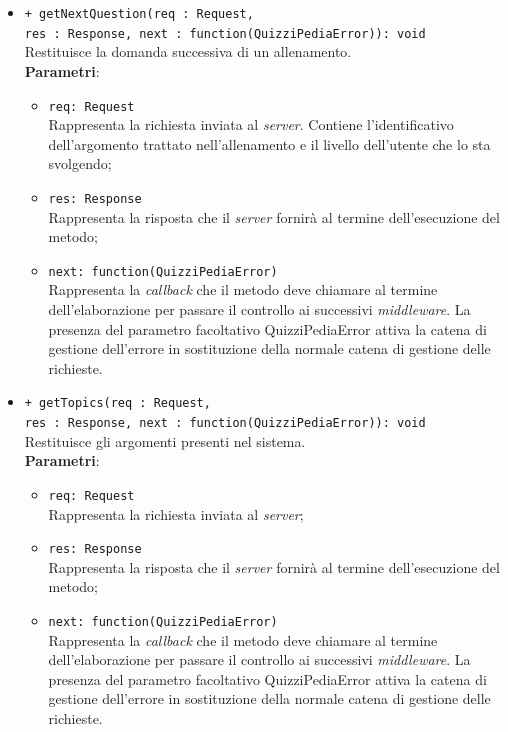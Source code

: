\begin{itemize}
\begin{itemize}
\begin{itemize}
			\end{itemize}
			\item \texttt{+ getNextQuestion(req : Request, \\res : Response, next : function(QuizziPediaError)): void} \\
			Restituisce la domanda successiva di un allenamento.  \\
			\textbf{Parametri}:
			\begin{itemize}
			\item \texttt{req: Request} \\
			Rappresenta la richiesta inviata al \textit{server}. Contiene l'identificativo dell'argomento trattato nell'allenamento e il livello dell'utente che lo sta svolgendo;
			\item \texttt{res: Response} \\
			Rappresenta la risposta che il \textit{server} fornirà al termine dell'esecuzione del metodo;
			\item \texttt{next: function(QuizziPediaError)} \\
			Rappresenta la \textit{callback} che il metodo deve chiamare al termine dell'elaborazione per passare il controllo ai successivi \textit{middleware}. La presenza del parametro facoltativo QuizziPediaError attiva la catena di gestione dell'errore in sostituzione della normale catena di gestione delle richieste.
			\end{itemize}
			\item \texttt{+ getTopics(req : Request, \\res : Response, next : function(QuizziPediaError)): void} \\
			Restituisce gli argomenti presenti nel sistema.  \\
			\textbf{Parametri}:
			\begin{itemize}
			\item \texttt{req: Request} \\
			Rappresenta la richiesta inviata al \textit{server};
			\item \texttt{res: Response} \\
			Rappresenta la risposta che il \textit{server} fornirà al termine dell'esecuzione del metodo;
			\item \texttt{next: function(QuizziPediaError)} \\
			Rappresenta la \textit{callback} che il metodo deve chiamare al termine dell'elaborazione per passare il controllo ai successivi \textit{middleware}. La presenza del parametro facoltativo QuizziPediaError attiva la catena di gestione dell'errore in sostituzione della normale catena di gestione delle richieste.

\end{itemize}
\end{itemize}
\end{itemize}
